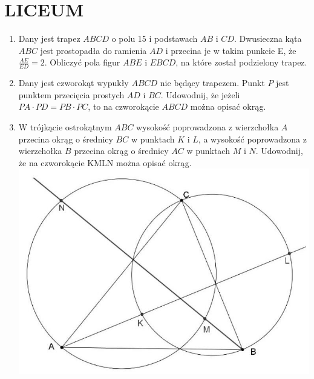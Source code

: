 \documentclass[10pt]{article}
\begin{document}
\section*{LICEUM}
\begin{enumerate}
  \item Dany jest trapez \(A B C D\) o polu 15 i podstawach \(A B\) i \(C D\). Dwusieczna kąta \(A B C\) jest prostopadła do ramienia \(A D\) i przecina je w takim punkcie E, że \(\frac{A E}{E D}=2\). Obliczyć pola figur \(A B E\) i \(E B C D\), na które został podzielony trapez.
  \item Dany jest czworokąt wypukły \(A B C D\) nie będący trapezem. Punkt \(P\) jest punktem przecięcia prostych \(A D\) i \(B C\). Udowodnij, że jeżeli \(P A \cdot P D=P B \cdot P C\), to na czworokącie \(A B C D\) można opisać okrąg.
  \item W trójkącie ostrokątnym \(A B C\) wysokość poprowadzona z wierzchołka \(A\) przecina okrąg o średnicy \(B C\) w punktach \(K\) i \(L\), a wysokość poprowadzona z wierzchołka \(B\) przecina okrąg o średnicy \(A C\) w punktach \(M\) i \(N\). Udowodnij, że na czworokącie KMLN można opisać okrąg.\\
\includegraphics[max width=\textwidth, center]{2024_11_21_e38482f605918448c267g-1(1)}
\end{enumerate}
\end{document}
